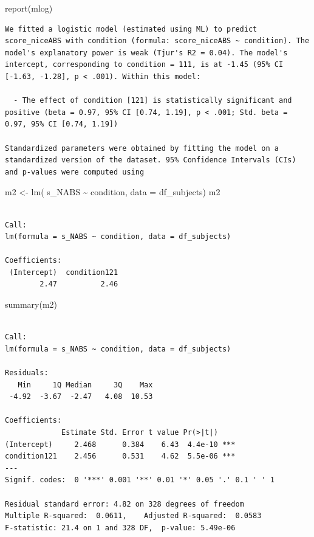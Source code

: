 \documentclass[
  letterpaper,
  DIV=11,
  numbers=noendperiod]{scrreprt}
\newenvironment{Shaded}{\begin{snugshade}}{\end{snugshade}}
\newcommand{\AttributeTok}[1]{\textcolor[rgb]{0.40,0.45,0.13}{#1}}
\newcommand{\FunctionTok}[1]{\textcolor[rgb]{0.28,0.35,0.67}{#1}}
\newcommand{\NormalTok}[1]{\textcolor[rgb]{0.00,0.23,0.31}{#1}}
\newcommand{\OtherTok}[1]{\textcolor[rgb]{0.00,0.23,0.31}{#1}}
\newcommand{\SpecialCharTok}[1]{\textcolor[rgb]{0.37,0.37,0.37}{#1}}
\begin{document}
\begin{Shaded}
\begin{Highlighting}[]
\FunctionTok{report}\NormalTok{(mlog)}
\end{Highlighting}
\end{Shaded}

\begin{verbatim}
We fitted a logistic model (estimated using ML) to predict score_niceABS with condition (formula: score_niceABS ~ condition). The model's explanatory power is weak (Tjur's R2 = 0.04). The model's intercept, corresponding to condition = 111, is at -1.45 (95% CI [-1.63, -1.28], p < .001). Within this model:

  - The effect of condition [121] is statistically significant and positive (beta = 0.97, 95% CI [0.74, 1.19], p < .001; Std. beta = 0.97, 95% CI [0.74, 1.19])

Standardized parameters were obtained by fitting the model on a standardized version of the dataset. 95% Confidence Intervals (CIs) and p-values were computed using 
\end{verbatim}

\begin{Shaded}
\begin{Highlighting}[]
\NormalTok{m2 }\OtherTok{\textless{}{-}} \FunctionTok{lm}\NormalTok{( s\_NABS }\SpecialCharTok{\textasciitilde{}}\NormalTok{ condition, }\AttributeTok{data =}\NormalTok{ df\_subjects)}
\NormalTok{m2}
\end{Highlighting}
\end{Shaded}

\begin{verbatim}

Call:
lm(formula = s_NABS ~ condition, data = df_subjects)

Coefficients:
 (Intercept)  condition121  
        2.47          2.46  
\end{verbatim}

\begin{Shaded}
\begin{Highlighting}[]
\FunctionTok{summary}\NormalTok{(m2)}
\end{Highlighting}
\end{Shaded}

\begin{verbatim}

Call:
lm(formula = s_NABS ~ condition, data = df_subjects)

Residuals:
   Min     1Q Median     3Q    Max 
 -4.92  -3.67  -2.47   4.08  10.53 

Coefficients:
             Estimate Std. Error t value Pr(>|t|)    
(Intercept)     2.468      0.384    6.43  4.4e-10 ***
condition121    2.456      0.531    4.62  5.5e-06 ***
---
Signif. codes:  0 '***' 0.001 '**' 0.01 '*' 0.05 '.' 0.1 ' ' 1

Residual standard error: 4.82 on 328 degrees of freedom
Multiple R-squared:  0.0611,    Adjusted R-squared:  0.0583 
F-statistic: 21.4 on 1 and 328 DF,  p-value: 5.49e-06
\end{verbatim}
\end{document}
